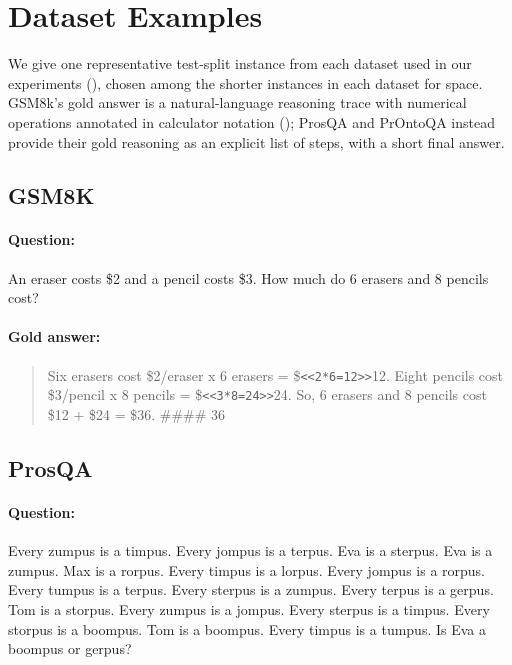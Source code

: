 \documentclass[11pt]{article}
\begin{document}

%


\appendix

\section{Dataset Examples}
\label{sec:appendix-examples}

We give one representative test-split instance from each dataset used in our experiments (), chosen among the shorter instances in each dataset for space. GSM8k's gold answer is a natural-language reasoning trace with numerical operations annotated in calculator notation (); ProsQA and PrOntoQA instead provide their gold reasoning as an explicit list of steps, with a short final answer.

\subsection{GSM8K}

\paragraph{Question:} An eraser costs \$2 and a pencil costs \$3. How much do 6 erasers and 8 pencils cost?

\paragraph{Gold answer:}
\begin{quote}
Six erasers cost \$2/eraser x 6 erasers = \$\verb|<<2*6=12>>|12.
Eight pencils cost \$3/pencil x 8 pencils = \$\verb|<<3*8=24>>|24.
So, 6 erasers and 8 pencils cost \$12 + \$24 = \$36.
\#\#\#\# 36
\end{quote}

\subsection{ProsQA}

\paragraph{Question:} Every zumpus is a timpus. Every jompus is a terpus. Eva is a sterpus. Eva is a zumpus. Max is a rorpus. Every timpus is a lorpus. Every jompus is a rorpus. Every tumpus is a terpus. Every sterpus is a zumpus. Every terpus is a gerpus. Tom is a storpus. Every zumpus is a jompus. Every sterpus is a timpus. Every storpus is a boompus. Tom is a boompus. Every timpus is a tumpus. Is Eva a boompus or gerpus?
\end{document}
